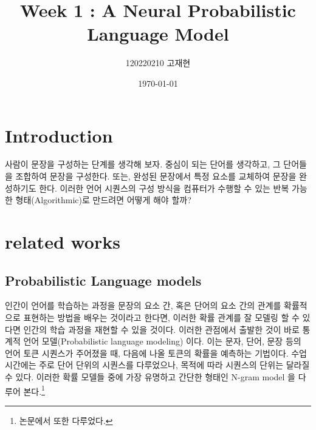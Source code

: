 \documentclass[
	11pt,
	a4paper,
	figtabcapt,
]{oblivoir}
\title{\vspace{-4cm}Week 1 : A Neural Probabilistic Language Model}
\author{120220210 고재현}
\date{\today}
\begin{document}


\maketitle





\setcounter{table}{0}		                    %
\setcounter{figure}{0}		                    %



\section{Introduction}
사람이 문장을 구성하는 단계를 생각해 보자. 중심이 되는 단어를 생각하고, 그 단어들을 조합하여 문장을 구성한다.
또는, 완성된 문장에서 특정 요소를 교체하여 문장을 완성하기도 한다.
이러한 언어 시퀀스의 구성 방식을 컴퓨터가 수행할 수 있는 반복 가능한 형태(Algorithmic)로 만드려면 어떻게 해야 할까?

\section{related works}
\subsection{Probabilistic Language models}
인간이 언어를 학습하는 과정을 문장의 요소 간, 혹은 단어의 요소 간의 관계를 확률적으로 표현하는 방법을 배우는 것이라고 한다면,
이러한 확률 관계를 잘 모델링 할 수 있다면 인간의 학습 과정을 재현할 수 있을 것이다.
이러한 관점에서 출발한 것이 바로 통계적 언어 모델(Probabilistic language modeling) 이다.
이는 문자, 단어, 문장 등의 언어 토큰 시퀀스가 주어졌을 때,
다음에 나올 토큰의 확률을 예측하는 기법이다.
수업 시간에는 주로 단어 단위의 시퀀스를 다루었으나, 목적에 따라 시퀀스의 단위는 달라질 수 있다.
이러한 확률 모델들 중에 가장 유명하고 간단한 형태인 N-gram model 을 다루어 본다.\footnote{논문에서 또한 다루었다.}
\end{document}
